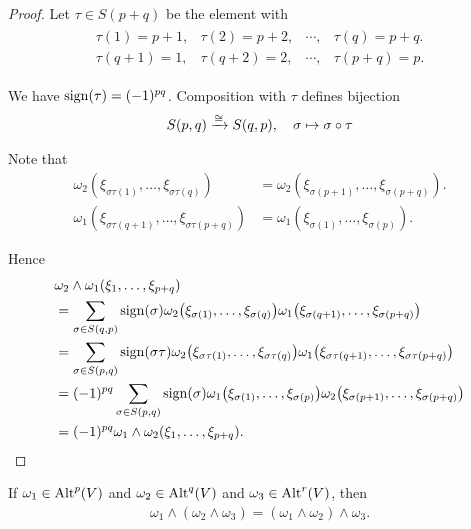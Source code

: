 \begin{proof}
  Let $\tau\in S(p+q)$ be the element with
  \begin{align*}
    \begin{array}{cccc}
      \tau(1)  = p+1 , & \tau(2)  = p+2, & \cdots, & \tau(q) = p+q. \\
      \tau(q+1) = 1,   & \tau(q+2) = 2,  & \cdots, & \tau(p+q) = p.
    \end{array}
  \end{align*}

  We have $\operatorname{sign}(\tau) = (-1)^{pq}$. Composition with $\tau$ defines bijection
  \begin{align*}
    S(p, q) \xra[\cong] S(q, p), \quad \sigma\mapsto\sigma\circ\tau
  \end{align*}

  Note that
  \begin{align*}
    \omega_2(\xi_{\sigma\tau(1)}, \ldots, \xi_{\sigma\tau(q)})
    & = \omega_2(\xi_{\sigma(p+1)}, \ldots, \xi_{\sigma(p+q)}). \\
    \omega_1(\xi_{\sigma\tau(q+1)}, \ldots, \xi_{\sigma\tau(p+q)})
    & = \omega_1(\xi_{\sigma(1)}, \ldots, \xi_{\sigma(p)}).
  \end{align*}

  Hence
  \begin{align*}
    & \omega_{2}\wedge\omega_{1}(\xi_{1},\ldots,\xi_{p+q})                                                         \\
    & = \sum_{\sigma\in S(q,p)}\operatorname{sign}(\sigma)\omega_{2}\big(\xi_{\sigma(1)},\ldots,\xi_{\sigma(q)}\big)
  \omega_{1}\big(\xi_{\sigma(q+1)},\ldots,\xi_{\sigma(p+q)}\big)                                                  \\
    & = \sum_{\sigma\in S(p,q)}\operatorname{sign}(\sigma\tau)\omega_{2}\big(\xi_{\sigma\tau(1)},\ldots,\xi_{\sigma\tau(q)}\big)
  \omega_{1}\big(\xi_{\sigma\tau(q+1)},\ldots,\xi_{\sigma\tau(p+q)}\big)                                          \\
    & = (-1)^{pq}\sum_{\sigma\in S(p,q)}\operatorname{sign}(\sigma)\omega_{1}\big(\xi_{\sigma(1)},\ldots,\xi_{\sigma(p)}\big)
  \omega_{2}\big(\xi_{\sigma(p+1)},\ldots,\xi_{\sigma(p+q)}\big)                                                  \\
    & = (-1)^{pq}\omega_{1}\wedge\omega_{2}(\xi_{1},\ldots,\xi_{p+q}).
  \end{align*}
\end{proof}


\begin{lemma}
  If $\omega_1\in\operatorname{Alt}^p(V)$ and $\omega_2\in\operatorname{Alt}^q(V)$ and $\omega_3\in\operatorname{Alt}^r(V)$, then
  \begin{align*}
    \omega_1\wedge(\omega_2\wedge\omega_3) = (\omega_1\wedge\omega_2)\wedge\omega_3.
  \end{align*}
\end{lemma}

